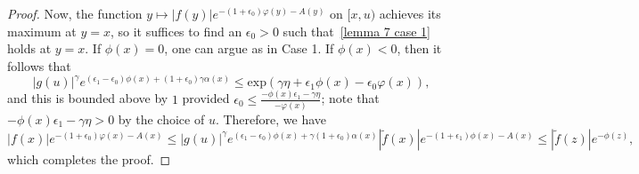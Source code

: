 \documentclass[10pt,reqno]{amsart}
\theoremstyle{plain}
\theoremstyle{definition}
\numberwithin{equation}{section}
\begin{document}
\begin{proof}
Now, the function $y \mapsto |f(y)|e^{-(1+\epsilon_0)\varphi(y) - A(y)}$ on $[x,u)$ achieves its maximum at $y=x$, so it suffices to find an $\epsilon_0 > 0$ such that~\cref{lemma 7 case 1} holds at $y=x$. 
If $\phi(x) = 0$, one can argue as in Case 1. If $\phi(x) < 0$, then 
it follows that
$$
|g(u)|^{\gamma} e^{(\epsilon_1 - \epsilon_0)\phi(x) + (1+\epsilon_0)\gamma \alpha(x)} \leq 
\textrm{exp}\left( \gamma  \eta + \epsilon_1 \phi(x) -\epsilon_0 \varphi(x) \right),
$$
and this is bounded above by $1$ 
provided $\epsilon_0 \leq \frac{-\phi(x) \epsilon_1 - \gamma \eta}{-\varphi(x)}$; note that $-\phi(x)\epsilon_1 - \gamma  \eta > 0$ by the choice of $u$. 
Therefore, we have 
$$
|f(x)|e^{-(1+\epsilon_0)\varphi(x)-A(x)} \leq |g(u)|^{\gamma} e^{(\epsilon_1 - \epsilon_0)\phi(x) + \gamma(1+\epsilon_0)\alpha(x)} |\tilde{f}(x)|e^{-(1+\epsilon_1)\phi(x)-A(x)}  \leq |\tilde{f}(z)|e^{-\phi(z)},
$$
which completes the proof.
%
%
%
%
\begin{comment}
\emph{Case 1}. Consider first the case where $c = \gamma$, i.e.\ $c$ is an integer, and $\Gamma_{\phi,n} = \emptyset$.
Then, $\Gamma_{\varphi,n} = [x,x_G]$ and we may assume that $\widetilde{f} = 1$ by~\cref{lemma:one_variant}; in particular, $|f(z)|e^{-\varphi(z)} \geq 1$. 
Arguing as in Case 1 of~\cref{lemma:two_variant}, it suffices to find an $\epsilon_0 > 0$ such that
\begin{equation}
\label{type 4 eqn 1}
|f(y)|e^{-(1+\epsilon_0)\varphi(y) - A(y)} \leq 1
\end{equation}
for all $y \in [x,x_G] \cup [u',u]$. In fact, $|f(y)|e^{-(1+\epsilon_0)\varphi(y) - A(y)} \leq |f(u)|e^{-(1+\epsilon_0)\varphi(u) - A(u)}$ for all $y \in [u',u]$, so it suffices to check~\cref{type 4 eqn 1} for $y \in [x,x_G]$.
As in Case 1 of~\cref{lemma:two_variant},~\cref{type 4 eqn 1} holds for $y \in [u,x_G]$ provided $\epsilon_0 \leq \frac{1}{c(n+1) + n}$; however, the function $y \mapsto |f(y)|e^{-(1+\epsilon_0)\varphi(y)-A(y)}$ increases as one moves down the segment $[u,x]$, with maximum achieved at $x$. 
Thus, it suffices to find $\epsilon_0 > 0$ such that $|f(x)|e^{-(1+\epsilon_0)\varphi(x) - A(x)} \leq 1$. 
Observe that
\begin{equation}
\label{type 4 eqn 2}
|f(x)|e^{-(1+\epsilon_0)\varphi(x)-A(x)} \leq e^{-c\alpha(u) -(1+\epsilon_0)\phi(x) + c\alpha(x) - \alpha(x)} 
\end{equation}
If $\phi(x) = 0$, then the inequality~\cref{type 4 eqn 2} $\leq 1$ is automatic, since we have chosen $\eta < \frac{\alpha(x)}{c}$. 
If $\phi(x) < 0$, then the inequality~\cref{type 4 eqn 2} $\leq 1$ holds provided $\epsilon_0 \leq \frac{\alpha(x) - c\eta - \phi(x)}{-\phi(x)}$. 
Note that $\alpha(x) - c\eta -\phi(x) > 0$ by our choice of $\eta$.


\end{comment}
\end{proof}
\end{document}
